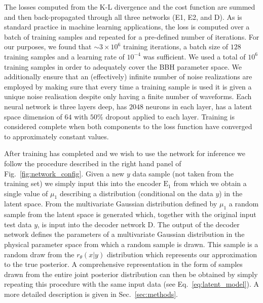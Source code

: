 \documentclass[%
showpacs,
 amsmath,amssymb,
 aps,
 twocolumn,
 prl,
 reprint,
floatfix,
]{revtex4-1}
\begin{document}
%
%
The losses computed from the K-L divergence and the cost function are summed
and then back-propagated through all three networks (E1, E2, and D).  As is
standard practice in machine learning applications, the loss is computed over a
batch of training samples and repeated for a pre-defined number of iterations.
For our purposes, we found that $\sim3\times10^6$ training iterations, a batch
size of $128$ training samples and a learning rate of $10^{-4}$ was sufficient.
We used a total of $10^6$ training samples in order to adequately cover the
\ac{BBH} parameter space.  We additionally ensure that an (effectively)
infinite number of noise realizations are employed by making sure that every
time a training sample is used it is given a unique noise realisation despite
only having a finite number of waveforms. Each neural network is three layers
deep, has $2048$ neurons in each layer, has a latent space dimension of $64$
with $50\%$ dropout applied to each layer. Training is considered complete when
both components to the loss function have converged to approximately constant
values.

%
%
After training has completed and we wish to use the network for inference we
follow the procedure described in the right hand panel of
Fig.~\ref{fig:network_config}. Given a new $y$ data sample (not taken from the
training set) we simply input this into the encoder $\textrm{E}_1$ from which we
obtain a single value of $\mu_{1}$ describing a distribution (conditional on the
data $y$) in the latent space. From the multivariate Gaussian distribution
defined by $\mu_{1}$ a random sample from the latent space is generated which,
together with the original input test data $y$, is input into the decoder
network D. The output of the decoder network defines the parameters of a
multivariate Gaussian distribution in the physical parameter space from which a
random sample is drawn. This sample is a random draw from the $r_{\theta}(x|y)$
distribution which represents our approximation to the true posterior. A
comprehensive representation in the form of samples drawn from the entire joint
posterior distribution can then be obtained by simply repeating this procedure
with the same input data (see Eq.~\ref{eq:latent_model}). A more detailed
description is given in Sec.~\ref{sec:methods}.
\end{document}

